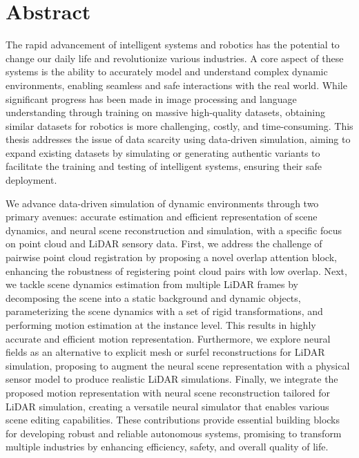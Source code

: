 
\chapter*{Abstract}
\label{chap:abstract}
The rapid advancement of intelligent systems and robotics has the potential to change our daily life and revolutionize various industries. A core aspect of these systems is the ability to accurately model and understand complex dynamic environments, enabling seamless and safe interactions with the real world. While significant progress has been made in image processing and language understanding through training on massive high-quality datasets, obtaining similar datasets for robotics is more challenging, costly, and time-consuming. This thesis addresses the issue of data scarcity using data-driven simulation, aiming to expand existing datasets by simulating or generating authentic variants to facilitate the training and testing of intelligent systems, ensuring their safe deployment.

We advance data-driven simulation of dynamic environments through two primary avenues: accurate estimation and efficient representation of scene dynamics, and neural scene reconstruction and simulation, with a specific focus on point cloud and LiDAR sensory data. First, we address the challenge of pairwise point cloud registration by proposing a novel overlap attention block, enhancing the robustness of registering point cloud pairs with low overlap. Next, we tackle scene dynamics estimation from multiple LiDAR frames by decomposing the scene into a static background and dynamic objects, parameterizing the scene dynamics with a set of rigid transformations, and performing motion estimation at the instance level. This results in highly accurate and efficient motion representation. Furthermore, we explore neural fields as an alternative to explicit mesh or surfel reconstructions for LiDAR simulation, proposing to augment the neural scene representation with a physical sensor model to produce realistic LiDAR simulations. Finally, we integrate the proposed motion representation with neural scene reconstruction tailored for LiDAR simulation, creating a versatile neural simulator that enables various scene editing capabilities. These contributions provide essential building blocks for developing robust and reliable autonomous systems, promising to transform multiple industries by enhancing efficiency, safety, and overall quality of life.


